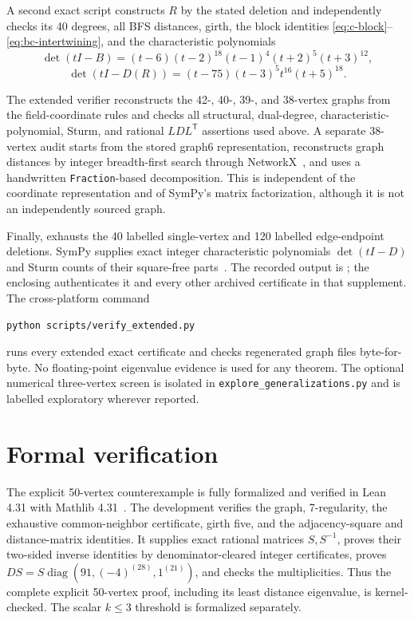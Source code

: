 \documentclass[a4paper,11pt,reqno]{amsart}
\theoremstyle{plain}
\theoremstyle{definition}
\theoremstyle{remark}
\begin{document}
A second exact script constructs \(R\) by the stated deletion and independently
checks its 40 degrees, all BFS distances, girth, the block identities
\eqref{eq:c-block}--\eqref{eq:bc-intertwining}, and the characteristic
polynomials
\[
 \det(tI-B)=(t-6)(t-2)^{18}(t-1)^4(t+2)^5(t+3)^{12},
\]
\[
 \det(tI-D(R))=(t-75)(t-3)^5t^{16}(t+5)^{18}.
\]

The extended verifier reconstructs the 42-, 40-, 39-, and 38-vertex graphs
from the field-coordinate rules and checks all structural, dual-degree,
characteristic-polynomial, Sturm, and rational
\(LDL^{\mathsf T}\) assertions used above.  A separate 38-vertex audit starts
from the stored graph6 representation, reconstructs graph distances by
integer breadth-first search through NetworkX~\cite{HagbergSchultSwart2008},
and uses a handwritten \texttt{Fraction}-based decomposition.  This is
independent of the coordinate representation and of SymPy's matrix
factorization, although it is not an independently sourced graph.

Finally,  exhausts the 40 labelled
single-vertex and 120 labelled edge-endpoint deletions.  SymPy supplies exact
integer characteristic polynomials \(\det(tI-D)\) and Sturm counts of their
square-free parts~\cite{MeurerEtAl2017}.  The recorded output is
; the
enclosing  authenticates it and every other archived
certificate in that supplement.
The cross-platform command
\begin{verbatim}
python scripts/verify_extended.py
\end{verbatim}
runs every extended exact certificate and checks regenerated graph files
byte-for-byte.  No floating-point eigenvalue evidence is used for any theorem.
The optional numerical three-vertex screen is isolated in
\texttt{explore\_generalizations.py} and is labelled exploratory wherever
reported.

\section{Formal verification}

The explicit 50-vertex counterexample is fully formalized and verified in
Lean 4.31 with Mathlib 4.31~\cite{deMouraUllrich2021,Mathlib2020}.  The
development verifies the graph, 7-regularity, the exhaustive common-neighbor
certificate, girth five, and the adjacency-square and distance-matrix
identities.  It supplies exact rational matrices \(S,S^{-1}\), proves their
two-sided inverse identities by denominator-cleared integer certificates,
proves \(DS=S\operatorname{diag}(91,(-4)^{(28)},1^{(21)})\), and checks the
multiplicities.  Thus the complete explicit 50-vertex proof, including its
least distance eigenvalue, is kernel-checked.  The scalar \(k\le3\) threshold
is formalized separately.
\end{document}
